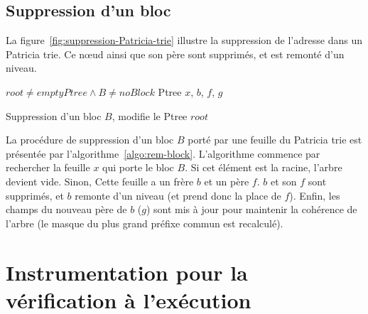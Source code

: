 \subsection{Suppression d'un bloc}


La figure~\ref{fig:suppression-Patricia-trie} illustre la suppression de
l'adresse  dans un Patricia trie.
Ce n\oe{}ud ainsi que son père  sont supprimés, et
 est remonté d'un niveau.




\begin{algorithm}[h!]
\begin{algorithmic}[1]
\Require $root \neq emptyPtree \land B \neq noBlock$
\Statex
{}
\Statex Ptree $x$, $b$, $f$, $g$
  \Else
  \EndIf
\EndWhile
{}
\Else
  \EndIf
  \EndIf
\EndIf
\EndProcedure
\end{algorithmic}
\caption{Suppression d'un bloc $B$, modifie le Ptree $root$
  \label{algo:rem-block}}
\end{algorithm}

La procédure de suppression d'un bloc $B$ porté par une feuille du Patricia trie
est présentée par l'algorithme~\ref{algo:rem-block}.
L'algorithme commence par rechercher la feuille $x$ qui porte le bloc $B$.
Si cet élément est la racine, l'arbre devient vide.
Sinon, Cette feuille a un frère $b$ et un père $f$.
$b$ et son $f$ sont supprimés, et $b$ remonte d'un niveau (et prend donc la
place de $f$).
Enfin, les champs du nouveau père de $b$ ($g$) sont mis à jour pour
maintenir la cohérence de l'arbre (le masque du plus grand préfixe commun est
recalculé).


\section{Instrumentation pour la vérification à l'exécution}
\label{sec:mem-instru}



